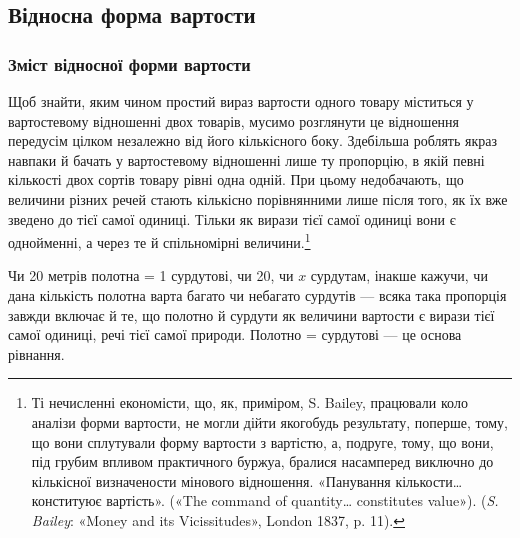 \subsection{Відносна форма вартости}

\subsubsection{Зміст відносної форми вартости}

Щоб знайти, яким чином простий вираз вартости одного товару
міститься у вартостевому відношенні двох товарів, мусимо
розглянути це відношення передусім цілком незалежно від його
кількісного боку. Здебільша роблять якраз навпаки й бачать у
вартостевому відношенні лише ту пропорцію, в якій певні кількості
двох сортів товару рівні одна одній. При цьому недобачають,
що величини різних речей стають кількісно порівнянними
лише після того, як їх вже зведено до тієї самої одиниці. Тільки
як вирази тієї самої одиниці вони є однойменні, а через те й спільномірні
величини.\footnote{
Ті нечисленні економісти, що, як, приміром, S. Bailey, працювали
коло аналізи форми вартости, не могли дійти якогобудь результату,
поперше, тому, що вони сплутували форму вартости з вартістю, а, подруге,
тому, що вони, під грубим впливом практичного буржуа, бралися насамперед
виключно до кількісної визначености мінового відношення. «Панування
кількости\dots{} конституює вартість». («The command of quantity\dots{}
constitutes value»). (\emph{S. Bailey}: «Money and its Vicissitudes», London
1837, p. 11).
}

Чи 20 метрів полотна = 1 сурдутові, чи 20, чи $x$ сурдутам,
інакше кажучи, чи дана кількість полотна варта багато чи небагато
сурдутів — всяка така пропорція завжди включає й те, що
полотно й сурдути як величини вартости є вирази тієї самої одиниці,
речі тієї самої природи. Полотно = сурдутові — це основа
рівнання.

